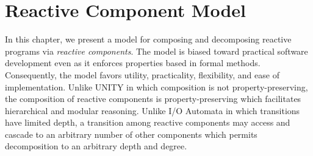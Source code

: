 \chapter{Reactive Component Model \label{model}}

In this chapter, we present a model for composing and decomposing reactive programs via \emph{reactive components}.
The model is biased toward practical software development even as it enforces properties based in formal methods.
Consequently, the model favors utility, practicality, flexibility, and ease of implementation.
Unlike UNITY in which composition is not property-preserving, the composition of reactive components is property-preserving which facilitates hierarchical and modular reasoning.
Unlike I/O Automata in which transitions have limited depth, a transition among reactive components may access and cascade to an arbitrary number of other components which permits decomposition to an arbitrary depth and degree.




